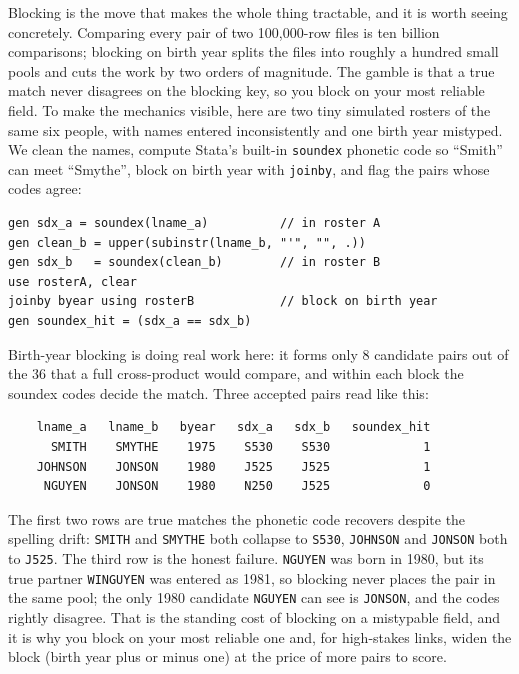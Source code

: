 \documentclass[
    a4paper,
    fontsize=10pt,
    twoside=true,
    numbers=noenddot,
]{kaobook}
\begin{document}
Blocking is the move that makes the whole thing tractable, and it is worth seeing concretely. Comparing every pair of two 100{,}000-row files is ten billion comparisons; blocking on birth year splits the files into roughly a hundred small pools and cuts the work by two orders of magnitude. The gamble is that a true match never disagrees on the blocking key, so you block on your most reliable field. To make the mechanics visible, here are two tiny simulated rosters of the same six people, with names entered inconsistently and one birth year mistyped. We clean the names, compute Stata's built-in \texttt{soundex} phonetic code so \enquote{Smith} can meet \enquote{Smythe}, block on birth year with \texttt{joinby}, and flag the pairs whose codes agree:
{\footnotesize
\begin{verbatim}
gen sdx_a = soundex(lname_a)          // in roster A
gen clean_b = upper(subinstr(lname_b, "'", "", .))
gen sdx_b   = soundex(clean_b)        // in roster B
use rosterA, clear
joinby byear using rosterB            // block on birth year
gen soundex_hit = (sdx_a == sdx_b)
\end{verbatim}
}
Birth-year blocking is doing real work here: it forms only 8 candidate pairs out of the 36 that a full cross-product would compare, and within each block the soundex codes decide the match. Three accepted pairs read like this:
{\footnotesize
\begin{verbatim}
    lname_a   lname_b   byear   sdx_a   sdx_b   soundex_hit
      SMITH    SMYTHE    1975    S530    S530             1
    JOHNSON    JONSON    1980    J525    J525             1
     NGUYEN    JONSON    1980    N250    J525             0
\end{verbatim}
}
The first two rows are true matches the phonetic code recovers despite the spelling drift: \texttt{SMITH} and \texttt{SMYTHE} both collapse to \texttt{S530}, \texttt{JOHNSON} and \texttt{JONSON} both to \texttt{J525}. The third row is the honest failure. \texttt{NGUYEN} was born in 1980, but its true partner \texttt{WINGUYEN} was entered as 1981, so blocking never places the pair in the same pool; the only 1980 candidate \texttt{NGUYEN} can see is \texttt{JONSON}, and the codes rightly disagree. That is the standing cost of blocking on a mistypable field, and it is why you block on your most reliable one and, for high-stakes links, widen the block (birth year plus or minus one) at the price of more pairs to score.
\end{document}
